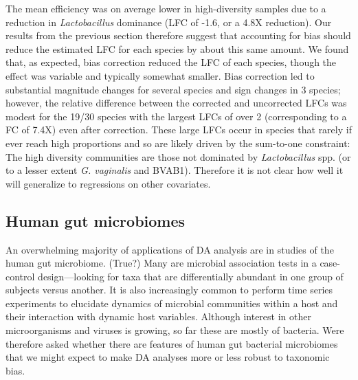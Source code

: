 \documentclass[
]{article}
\begin{document}
The mean efficiency was on average lower in high-diversity samples due to a reduction in \emph{Lactobacillus} dominance (LFC of -1.6, or a 4.8X reduction).
Our results from the previous section therefore suggest that accounting for bias should reduce the estimated LFC for each species by about this same amount.
We found that, as expected, bias correction reduced the LFC of each species, though the effect was variable and typically somewhat smaller.
Bias correction led to substantial magnitude changes for several species and sign changes in 3 species; however, the relative difference between the corrected and uncorrected LFCs was modest for the 19/30 species with the largest LFCs of over 2 (corresponding to a FC of 7.4X) even after correction.
These large LFCs occur in species that rarely if ever reach high proportions and so are likely driven by the sum-to-one constraint: The high diversity communities are those not dominated by \emph{Lactobacillus} spp. (or to a lesser extent \emph{G. vaginalis} and BVAB1).
Therefore it is not clear how well it will generalize to regressions on other covariates.

\hypertarget{human-gut-microbiomes}{%
\subsection{Human gut microbiomes}\label{human-gut-microbiomes}}

An overwhelming majority of applications of DA analysis are in studies of the human gut microbiome. (True?)
Many are microbial association tests in a case-control design---looking for taxa that are differentially abundant in one group of subjects versus another.
It is also increasingly common to perform time series experiments to elucidate dynamics of microbial communities within a host and their interaction with dynamic host variables.
Although interest in other microorganisms and viruses is growing, so far these are mostly of bacteria.
Were therefore asked whether there are features of human gut bacterial microbiomes that we might expect to make DA analyses more or less robust to taxonomic bias.
\end{document}
